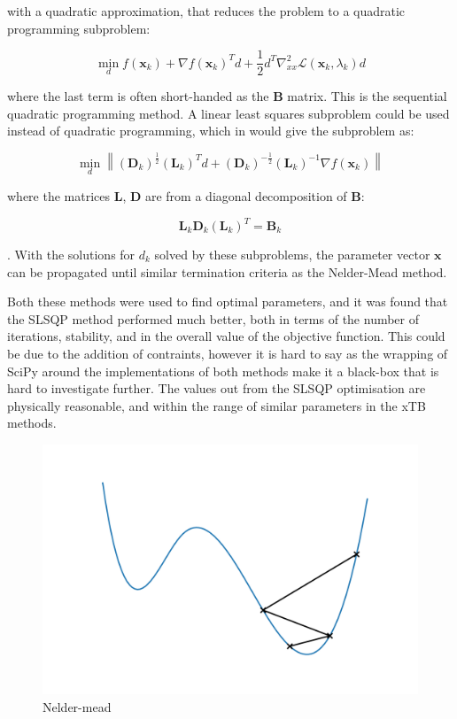 with a quadratic approximation, that reduces the problem to a quadratic programming
subproblem:

\begin{equation}
\min_d f\left(\mathbf{x}_k\right) + \nabla f\left(\mathbf{x}_k\right)^T d + \frac{1}{2}d^T \nabla^2_{xx} \mathcal{L} \left(\mathbf{x}_k, \lambda_k \right) d
\end{equation}

where the last term is often short-handed as the $\mathbf{B}$ matrix. This is the 
sequential quadratic programming method. A linear least squares subproblem could
be used instead of quadratic programming, which in would give the subproblem as:

\begin{equation}
\min_d \left\| \left(\mathbf{D}_k\right)^{\frac{1}{2}} \left(\mathbf{L}_k\right)^T d + \left(\mathbf{D}_k\right)^{-\frac{1}{2}}\left(\mathbf{L}_k\right)^{-1}\nabla f \left(\mathbf{x}_k\right)\right\|
\end{equation}

where the matrices $\mathbf{L}$, $\mathbf{D}$ are from a diagonal decomposition 
of $\mathbf{B}$:

\begin{equation}
\mathbf{L}_k \mathbf{D}_k \left(\mathbf{L}_k\right)^T = \mathbf{B}_k
\end{equation}

. With the solutions for $d_k$ solved by these subproblems, the parameter vector
$\mathbf{x}$ can be propagated until similar termination criteria as the Nelder-Mead
method.

Both these methods were used to find optimal parameters, and it was found that
the SLSQP method performed much better, both in terms of the number of iterations,
stability, and in the overall value of the objective function. This could be due 
to the addition of contraints, however it is hard to say as the wrapping of SciPy
around the implementations of both methods make it a black-box that is hard to 
investigate further. The values out from the SLSQP optimisation are physically
reasonable, and within the range of similar parameters in the xTB methods.

\begin{figure}
    \includegraphics{nelder-mead.png}
    \caption{Nelder-mead}
\end{figure}

